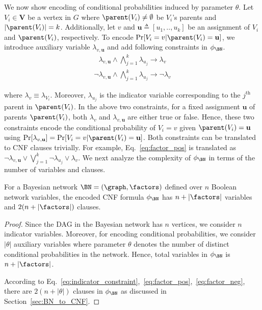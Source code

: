 We now show encoding of conditional probabilities induced by parameter $ \theta $. Let $ V_i \in  \mathbf{V}  $  be a vertex in $ G $ where $ \parent(V_i) \ne \emptyset $ be $ V_i $'s parents and $ |\parent(V_i)| = k $. Additionally, let $ v $ and $ \mathbf{u} \triangleq [u_1,.., u_k] $ be an assignment of  $ V_i $ and $ \parent(V_i)  $, respectively.  To encode $ \Pr[V_i = v| \parent(V_i) = \mathbf{u}]$, we introduce auxiliary variable $ \lambda_{v,\mathbf{u}} $ and add following constraints in $ \phi_{\BN} $.
\begin{align}
	\lambda_{v,\mathbf{u}}  \wedge \bigwedge_{j=1}^{k} \lambda_{u_j} \rightarrow \lambda_v
	\label{eq:factor_pos}
\end{align}
\begin{align}
	\neg \lambda_{v,\mathbf{u}}  \wedge \bigwedge_{j=1}^{k} \lambda_{u_j} \rightarrow \neg \lambda_v
	\label{eq:factor_neg}
\end{align}

where $ \lambda_v \equiv \lambda_{V_i} $. Moreover, $ \lambda_{u_j} $ is the indicator variable corresponding to the $ j^\text{th} $ parent in $ \parent(V_i) $. In the above two constraints,	for a fixed assignment $ \mathbf{u} $ of parents $ \parent(V_i) $, both $ \lambda_v $ and $ \lambda_{v,\mathbf{u}} $ are either true or false.  Hence, these two constraints encode the conditional probability of $ V_i = v $ given $ \parent(V_i) = \mathbf{u} $ using $ \Pr[\lambda_{v,\mathbf{u}}] = \Pr[V_i = v| \parent(V_i) = \mathbf{u}]$. Both constraints can be translated to CNF clauses trivially. For example, Eq.~\ref{eq:factor_pos} is translated as $ \neg \lambda_{v,\mathbf{u}}  \vee \bigvee_{j=1}^{k} \neg \lambda_{u_j} \vee \lambda_v $. We next analyze the complexity of $ \phi_\BN $ in terms of the number of variables and clauses.

\begin{lemma}
	For a Bayesian network $ \BN = (\graph, \factors) $ defined over $ n $ Boolean network variables, the encoded CNF formula $ \phi_\BN $ has $ n + |\factors| $  variables and $ 2(n + |\factors|) $ clauses. 
\end{lemma}
\begin{proof}
	Since the DAG in the Bayesian network has $ n $ vertices, we consider $ n $ indicator variables. Moreover, for encoding conditional probabilities, we consider $ |\theta| $ auxiliary variables where parameter $ \theta $ denotes the number of distinct conditional probabilities in the network. Hence, total variables in $ \phi_\BN $ is $ n + |\factors|  $.
	
	According to Eq.~\eqref{eq:indicator_constraint},~\eqref{eq:factor_pos},~\eqref{eq:factor_neg}, there are $2( n + |\theta|) $ clauses in $ \phi_\BN $ as discussed in Section~\ref{sec:BN_to_CNF}.
	
	
\end{proof}

